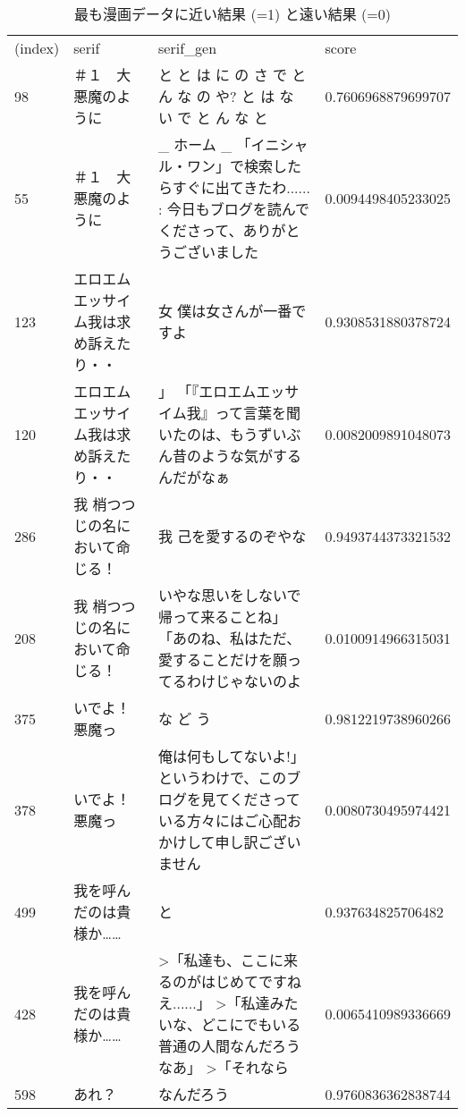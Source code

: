 \documentclass[onecolumn]{ujarticle}   %
\begin{document}
\begin{table}[tbh]
  \begin{center}
    \caption{最も漫画データに近い結果 (=1) と遠い結果 (=0) }
    \begin{tabular}{lp{5cm}p{7cm}l}
(index) & serif               & serif\_gen                                                                   & score              \\
98      & ＃１　大悪魔のように          & と と は に の さ で と ん な の や? と は な い で と ん な と                                   & 0.7606968879699707 \\
55      & ＃１　大悪魔のように          & \_ ホーム \_ 「イニシャル・ワン」で検索したらすぐに出てきたわ...... : 今日もブログを読んでくださって、ありがとうございました       & 0.0094498405233025 \\
123     & エロエムエッサイム我は求め訴えたり・・ & 女 僕は女さんが一番ですよ                                                                & 0.9308531880378724 \\
120     & エロエムエッサイム我は求め訴えたり・・ & 」 「『エロエムエッサイム我』って言葉を聞いたのは、もうずいぶん昔のような気がするんだがなぁ                               & 0.0082009891048073 \\
286     & 我 梢つつじの名において命じる！    & 我 己を愛するのぞやな                                                                  & 0.9493744373321532 \\
208     & 我 梢つつじの名において命じる！    & いやな思いをしないで帰って来ることね」 「あのね、私はただ、愛することだけを願ってるわけじゃないのよ                           & 0.0100914966315031 \\
375     & いでよ！ 悪魔っ            & な ど う                                                                        & 0.9812219738960266 \\
378     & いでよ！ 悪魔っ            & 俺は何もしてないよ!」 というわけで、このブログを見てくださっている方々にはご心配おかけして申し訳ございません                      & 0.0080730495974421 \\
499     & 我を呼んだのは貴様か……        & と                                                                            & 0.937634825706482  \\
428 & 我を呼んだのは貴様か…… & \textgreater{}「私達も、ここに来るのがはじめてですねえ......」 \textgreater{}「私達みたいな、どこにでもいる普通の人間なんだろうなあ」 \textgreater{}「それなら & 0.0065410989336669 \\
598     & あれ？                 & なんだろう                                                                        & 0.9760836362838744 \\

\end{tabular}
\end{center}
\end{table}
\end{document}
